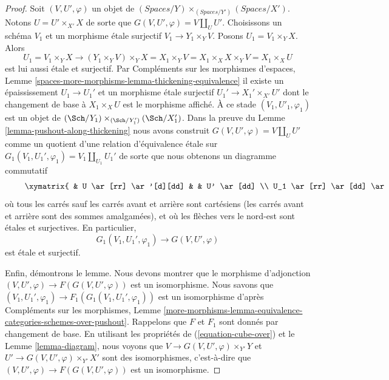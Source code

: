 \begin{proof}
\medskip\noindent
Soit $(V, U', \varphi)$ un objet de
$(\textit{Spaces}/Y) \times_{(\textit{Spaces}/Y')} (\textit{Spaces}/X')$.
Notons $U = U' \times_{X'} X$ de sorte que $G(V, U', \varphi) = V \amalg_U U'$.
Choisissons un schéma $V_1$ et un morphisme \'etale surjectif
$V_1 \to Y_1 \times_Y V$. Posons $U_1 = V_1 \times_Y X$. Alors
$$
U_1 = V_1 \times_Y X
\longrightarrow
(Y_1 \times_Y V) \times_Y X =
X_1 \times_Y V = X_1 \times_X X \times_Y V = X_1 \times_X U
$$
est lui aussi \'etale et surjectif. Par
Compléments sur les morphismes d'espaces, Lemme
\ref{spaces-more-morphisms-lemma-thickening-equivalence}
il existe un épaississement $U_1 \to U_1'$ et un morphisme \'etale surjectif
$U_1' \to X_1' \times_{X'} U'$ dont le changement de base à $X_1 \times_X U$ est le
morphisme affiché. À ce stade $(V_1, U'_1, \varphi_1)$ est un objet de
$(\Sch/Y_1) \times_{(\Sch/Y_1')} (\Sch/X_1')$. Dans la preuve du
Lemme \ref{lemma-pushout-along-thickening} nous avons construit
$G(V, U', \varphi) = V \amalg_U U'$ comme un quotient d'une relation
d'équivalence \'etale sur $G_1(V_1, U_1', \varphi_1) = V_1 \amalg_{U_1} U_1'$
de sorte que nous obtenons un diagramme commutatif
\begin{equation}
\label{equation-cube-over}
\vcenter{
\xymatrix{
& U \ar[rr] \ar'[d][dd] & & U' \ar[dd] \\
U_1 \ar[rr] \ar[dd] \ar[ru] & & U_1' \ar[dd] \ar[ru] & \\
& V \ar'[r][rr] & & G(V, U', \varphi) \\
V_1 \ar[rr] \ar[ru] & & G_1(V_1, U_1', \varphi_1) \ar[ru]
}
}
\end{equation}
où tous les carrés sauf les carrés avant et arrière sont cartésiens (les carrés avant et arrière sont des sommes amalgamées), et où les flèches vers le nord-est sont \'etales et surjectives. En particulier, $$
G_1(V_1, U_1', \varphi_1) \to G(V, U', \varphi)
$$ est \'etale et surjectif.

\medskip\noindent
Enfin, démontrons le lemme. Nous devons montrer que le morphisme d'adjonction $(V, U', \varphi) \to F(G(V, U', \varphi))$ est un isomorphisme. Nous savons que $(V_1, U_1', \varphi_1) \to F_1(G_1(V_1, U_1', \varphi_1))$ est un isomorphisme d'après Compléments sur les morphismes, Lemme \ref{more-morphisms-lemma-equivalence-categories-schemes-over-pushout}. Rappelons que $F$ et $F_1$ sont donnés par changement de base. En utilisant les propriétés de (\ref{equation-cube-over}) et le Lemme \ref{lemma-diagram}, nous voyons que $V \to G(V, U', \varphi) \times_{Y'} Y$ et $U' \to G(V, U', \varphi) \times_{Y'} X'$ sont des isomorphismes, c'est-à-dire que $(V, U', \varphi) \to F(G(V, U', \varphi))$ est un isomorphisme. 
\end{proof}

